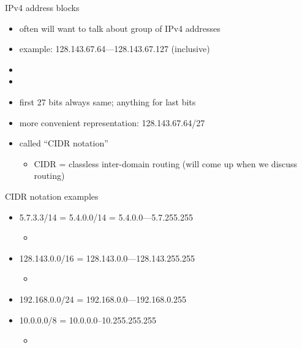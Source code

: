 \begin{frame}{IPv4 address blocks}
\begin{itemize}
    \item often will want to talk about group of IPv4 addresses
    \item example: {128.143.67.64}---{128.143.67.127} (inclusive)
    \item<2-> {\tt{}}
    \item<2-> {\tt{}}
    \item<3-> first 27 bits always same; anything for last bits
    \item<5-> more convenient representation: 128.143.67.64/27
    \item<5-> called ``CIDR notation''
        \begin{itemize}
        \item CIDR = classless inter-domain routing (will come up when we discuss routing)
        \end{itemize}
\end{itemize}
\end{frame}

\begin{frame}{CIDR notation examples}
    \begin{itemize}
    \item 5.7.3.3/14 = 5.4.0.0/14 = 5.4.0.0---5.7.255.255
        \begin{itemize}
        \item<2-> 
        \end{itemize}
    \item 128.143.0.0/16 =  128.143.0.0---128.143.255.255
        \begin{itemize}
        \item<2-> 
        \end{itemize}
    \item 192.168.0.0/24 =  192.168.0.0---192.168.0.255
    \item 10.0.0.0/8 = 10.0.0.0--10.255.255.255
        \begin{itemize}
        \item<2-> 
        \end{itemize}
    \end{itemize}
\end{frame}

